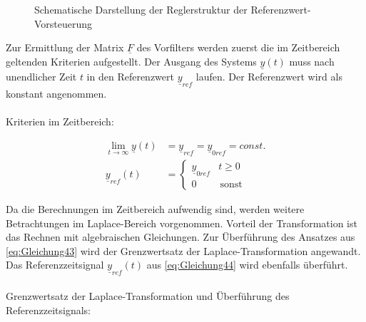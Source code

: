 \begin{figure}[H]
    \centering
    \caption[Reglerstruktur Vorsteuerung]{Schematische Darstellung der Reglerstruktur der Referenzwert-Vorsteuerung}
    \label{fig:Bild9}
\end{figure}

Zur Ermittlung der Matrix $\underline{F}$ des Vorfilters werden zuerst die im Zeitbereich geltenden Kriterien aufgestellt. Der Ausgang des Systems $\underline{y}(t)$ muss nach unendlicher Zeit $t$ in den Referenzwert $\underline{y}_{ref}$ laufen. Der Referenzwert wird als konstant angenommen.\\\\
Kriterien im Zeitbereich:

\begin{align}
    \lim_{t \to \infty} \underline{y}(t) &= \underline{y}_{ref} = \underline{y}_{0ref} = const. \label{eq:Gleichung43}\\
    \underline{y}_{ref}(t) &=
    \begin{cases}
        \underline{y}_{0ref} & t \geq 0 \\
        0 & \, \text{sonst}
    \end{cases} \label{eq:Gleichung44}
\end{align}

Da die Berechnungen im Zeitbereich aufwendig sind, werden weitere Betrachtungen im Laplace-Bereich vorgenommen. Vorteil der Transformation ist das Rechnen mit algebraischen Gleichungen. Zur Überführung des Ansatzes aus \autoref{eq:Gleichung43} wird der Grenzwertsatz der Laplace-Transformation angewandt. Das Referenzzeitsignal $\underline{y}_{ref}(t)$ aus \autoref{eq:Gleichung44} wird ebenfalls überführt.\\\\
Grenzwertsatz der Laplace-Transformation und Überführung des Referenzzeitsignals:

